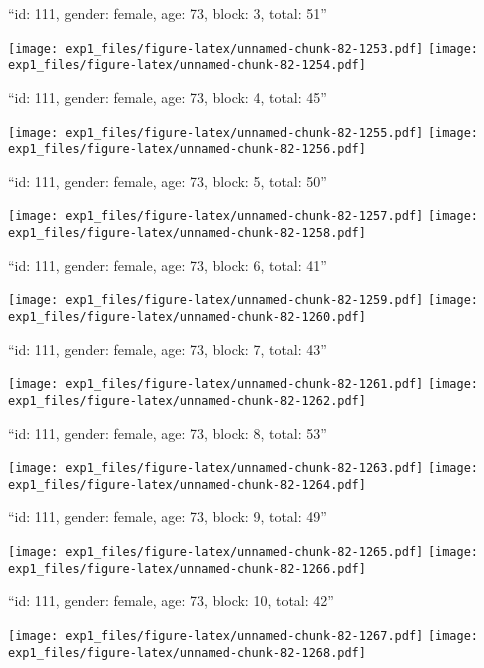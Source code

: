 \documentclass[11pt,,]{article}
\begin{document}
\newpage
[1] 

``id: 111, gender: female, age: 73, block: 3, total: 51''

\texttt{[image: exp1\_files/figure-latex/unnamed-chunk-82-1253.pdf]}
\texttt{[image: exp1\_files/figure-latex/unnamed-chunk-82-1254.pdf]}

\newpage
[1] 

``id: 111, gender: female, age: 73, block: 4, total: 45''

\texttt{[image: exp1\_files/figure-latex/unnamed-chunk-82-1255.pdf]}
\texttt{[image: exp1\_files/figure-latex/unnamed-chunk-82-1256.pdf]}

\newpage
[1] 

``id: 111, gender: female, age: 73, block: 5, total: 50''

\texttt{[image: exp1\_files/figure-latex/unnamed-chunk-82-1257.pdf]}
\texttt{[image: exp1\_files/figure-latex/unnamed-chunk-82-1258.pdf]}

\newpage
[1] 

``id: 111, gender: female, age: 73, block: 6, total: 41''

\texttt{[image: exp1\_files/figure-latex/unnamed-chunk-82-1259.pdf]}
\texttt{[image: exp1\_files/figure-latex/unnamed-chunk-82-1260.pdf]}

\newpage
[1] 

``id: 111, gender: female, age: 73, block: 7, total: 43''

\texttt{[image: exp1\_files/figure-latex/unnamed-chunk-82-1261.pdf]}
\texttt{[image: exp1\_files/figure-latex/unnamed-chunk-82-1262.pdf]}

\newpage
[1] 

``id: 111, gender: female, age: 73, block: 8, total: 53''

\texttt{[image: exp1\_files/figure-latex/unnamed-chunk-82-1263.pdf]}
\texttt{[image: exp1\_files/figure-latex/unnamed-chunk-82-1264.pdf]}

\newpage
[1] 

``id: 111, gender: female, age: 73, block: 9, total: 49''

\texttt{[image: exp1\_files/figure-latex/unnamed-chunk-82-1265.pdf]}
\texttt{[image: exp1\_files/figure-latex/unnamed-chunk-82-1266.pdf]}

\newpage
[1] 

``id: 111, gender: female, age: 73, block: 10, total: 42''

\texttt{[image: exp1\_files/figure-latex/unnamed-chunk-82-1267.pdf]}
\texttt{[image: exp1\_files/figure-latex/unnamed-chunk-82-1268.pdf]}
\end{document}
